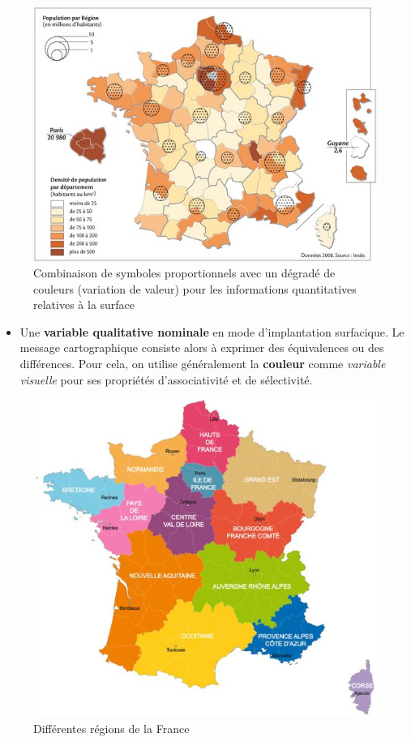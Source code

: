\begin{figure}[htbp]
\centering
\includegraphics{figures/example_proportion_and_cho.jpg}
\caption{Combinaison de symboles proportionnels avec un dégradé de
couleurs (variation de valeur) pour les informations quantitatives
relatives à la surface}
\end{figure}

\begin{itemize}
\tightlist
\item
  Une \textbf{variable qualitative nominale} en mode d'implantation
  surfacique. Le message cartographique consiste alors à exprimer des
  équivalences ou des différences. Pour cela, on utilise généralement la
  \textbf{couleur} comme \emph{variable visuelle} pour ses propriétés
  d'associativité et de sélectivité.
\end{itemize}

\begin{figure}[htbp]
\centering
\includegraphics{figures/examples_regions.jpg}
\caption{Différentes régions de la France}
\end{figure}

